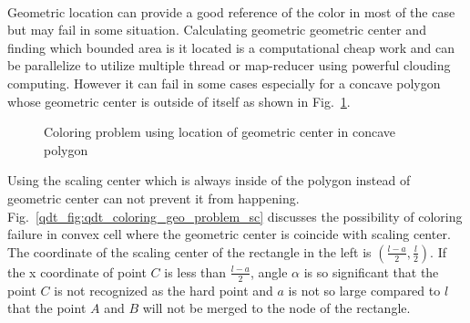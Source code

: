 \paragraph{}
Geometric location can provide a good reference of the color in most of the case but may fail in some situation.
Calculating geometric geometric center and finding which bounded area is it located is a computational cheap work and can be parallelize to utilize multiple thread or map-reducer using powerful clouding computing.
However it can fail in some cases especially for a concave polygon whose geometric center is outside of itself as shown in Fig.~\ref{qdt_fig:qdt_coloring_geo_problem}.
\begin{figure}[h!]
    \centering
    \caption[Coloring problem using location of geometric center in concave polygon]{Coloring problem using location of geometric center in concave polygon}
    \label{qdt_fig:qdt_coloring_geo_problem}
\end{figure}
%
Using the scaling center which is always inside of the polygon instead of geometric center can not prevent it from happening.
Fig.~\ref{qdt_fig:qdt_coloring_geo_problem_sc} discusses the possibility of coloring failure in convex cell where the geometric center is coincide with scaling center.
The coordinate of the scaling center of the rectangle in the left is $(\frac{l-a}{2},\frac{l}{2})$.
If the x coordinate of point $C$ is less than $\frac{l-a}{2}$, angle $\alpha$ is so significant that the point $C$ is not recognized as the hard point and $a$ is not so large compared to $l$ that the point $A$ and $B$ will not be merged to the node of the rectangle.

